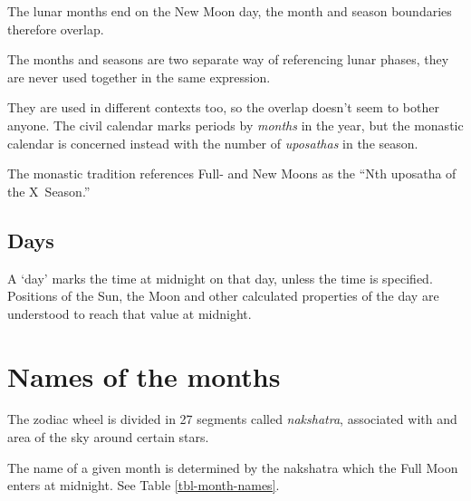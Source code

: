 \documentclass[11pt,oneside]{memoir-article}
\begin{document}
The lunar months end on the New Moon day, the month and season boundaries
therefore overlap.

The months and seasons are two separate way of referencing lunar phases, they
are never used together in the same expression.

They are used in different contexts too, so the overlap doesn't seem to bother
anyone. The civil calendar marks periods by \emph{months} in the year, but the
monastic calendar is concerned instead with the number of \emph{uposathas} in the
season.

The monastic tradition references Full- and New Moons as the ``Nth uposatha of the X~Season.''

\subsection{Days}
\label{sec-3-2-4}

A `day' marks the time at midnight on that day, unless the time is specified.
Positions of the Sun, the Moon and other calculated properties of the day are
understood to reach that value at midnight.

\section{Names of the months}
\label{sec-3-3}

The zodiac wheel is divided in 27 segments called \emph{nakshatra}, associated with
and area of the sky around certain stars.

The name of a given month is determined by the nakshatra which the Full Moon
enters at midnight. See Table \ref{tbl-month-names}.

\savenotes
\end{document}
